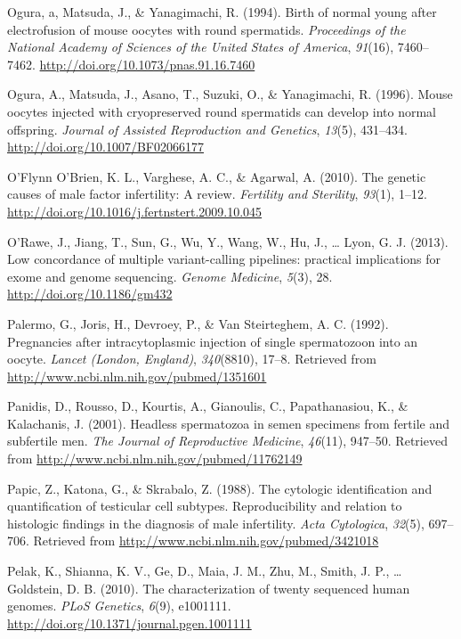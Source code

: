 \documentclass[12pt,twoside]{reedthesis}
\theoremstyle{definition}
\theoremstyle{definition}
\theoremstyle{remark}
\begin{document}
  \hypertarget{ref-Ogura1994}{}
  Ogura, a, Matsuda, J., \& Yanagimachi, R. (1994). Birth of normal young
  after electrofusion of mouse oocytes with round spermatids.
  \emph{Proceedings of the National Academy of Sciences of the United
  States of America}, \emph{91}(16), 7460--7462.
  \url{http://doi.org/10.1073/pnas.91.16.7460}
  
  \hypertarget{ref-Kimura1995}{}
  Ogura, A., Matsuda, J., Asano, T., Suzuki, O., \& Yanagimachi, R.
  (1996). Mouse oocytes injected with cryopreserved round spermatids can
  develop into normal offspring. \emph{Journal of Assisted Reproduction
  and Genetics}, \emph{13}(5), 431--434.
  \url{http://doi.org/10.1007/BF02066177}
  
  \hypertarget{ref-OFlynnOBrien2010}{}
  O'Flynn O'Brien, K. L., Varghese, A. C., \& Agarwal, A. (2010). The
  genetic causes of male factor infertility: A review. \emph{Fertility and
  Sterility}, \emph{93}(1), 1--12.
  \url{http://doi.org/10.1016/j.fertnstert.2009.10.045}
  
  \hypertarget{ref-ORawe2013}{}
  O'Rawe, J., Jiang, T., Sun, G., Wu, Y., Wang, W., Hu, J., \ldots{} Lyon,
  G. J. (2013). Low concordance of multiple variant-calling pipelines:
  practical implications for exome and genome sequencing. \emph{Genome
  Medicine}, \emph{5}(3), 28. \url{http://doi.org/10.1186/gm432}
  
  \hypertarget{ref-Palermo1992}{}
  Palermo, G., Joris, H., Devroey, P., \& Van Steirteghem, A. C. (1992).
  Pregnancies after intracytoplasmic injection of single spermatozoon into
  an oocyte. \emph{Lancet (London, England)}, \emph{340}(8810), 17--8.
  Retrieved from \url{http://www.ncbi.nlm.nih.gov/pubmed/1351601}
  
  \hypertarget{ref-Panidis2001}{}
  Panidis, D., Rousso, D., Kourtis, A., Gianoulis, C., Papathanasiou, K.,
  \& Kalachanis, J. (2001). Headless spermatozoa in semen specimens from
  fertile and subfertile men. \emph{The Journal of Reproductive Medicine},
  \emph{46}(11), 947--50. Retrieved from
  \url{http://www.ncbi.nlm.nih.gov/pubmed/11762149}
  
  \hypertarget{ref-Papic}{}
  Papic, Z., Katona, G., \& Skrabalo, Z. (1988). The cytologic
  identification and quantification of testicular cell subtypes.
  Reproducibility and relation to histologic findings in the diagnosis of
  male infertility. \emph{Acta Cytologica}, \emph{32}(5), 697--706.
  Retrieved from \url{http://www.ncbi.nlm.nih.gov/pubmed/3421018}
  
  \hypertarget{ref-Pelak2010}{}
  Pelak, K., Shianna, K. V., Ge, D., Maia, J. M., Zhu, M., Smith, J. P.,
  \ldots{} Goldstein, D. B. (2010). The characterization of twenty
  sequenced human genomes. \emph{PLoS Genetics}, \emph{6}(9), e1001111.
  \url{http://doi.org/10.1371/journal.pgen.1001111}
  
\end{document}
